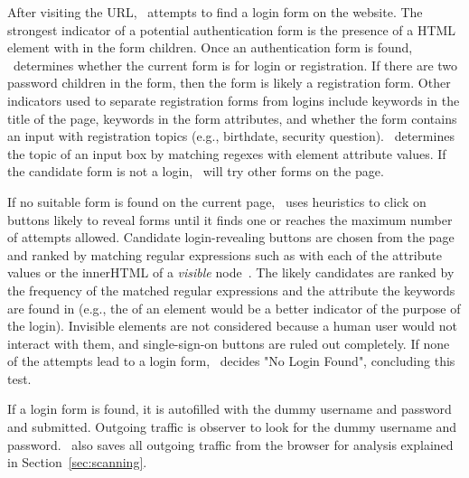  
 After visiting the URL, \SwapScan\ attempts to find a login form on the website. 
The strongest indicator of a potential authentication form is the presence of a HTML element with  in the form children. Once an authentication form is found, \SwapScan\ determines whether the current form is for login or registration. If there are two password children in the form, then the form is likely a registration form. Other indicators used to separate registration forms from logins include keywords in the title of the page, keywords in the form attributes, and whether the form contains an input with registration topics (e.g., birthdate, security question). \SwapScan\ determines the topic of an input box by matching regexes with element attribute values.  If the candidate form is not a login, \SwapScan\ will try other forms on the page.


If no suitable form is found on the current page, \SwapScan\ uses heuristics to click on buttons likely to reveal forms until it finds one or reaches the maximum number of attempts allowed. Candidate login-revealing buttons are chosen from the page and ranked by matching regular expressions such as \code{[Ll][Oo][Gg][liOo][Nn]} with each of the attribute values or the innerHTML of a \textit{visible} node~\cite{Zhou2014}. The likely candidates are ranked by the frequency of the matched regular expressions and the attribute the keywords are found in (e.g., the  of an element would be a better indicator of the purpose of the login).  Invisible elements are not considered because a human user would not interact with them, and single-sign-on buttons are ruled out completely. If none of the attempts lead to a login form, \SwapScan\ decides "No Login Found", concluding this test.

 If a login form is found, it is autofilled with the dummy username and password and submitted.  Outgoing traffic is observer to look for the dummy username and password.  \SwapScan\ also saves all outgoing traffic from the browser for analysis explained in Section~\ref{sec:scanning}.   

